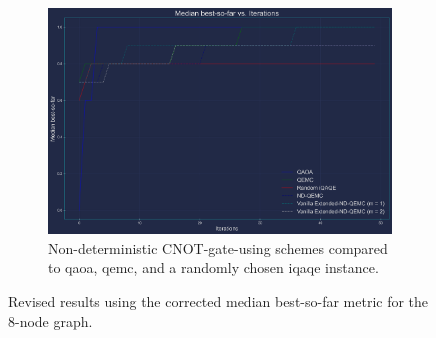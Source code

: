 \clearpage

\begin{figure}[ht!]
	\addtocounter{figure}{-1} %
    \centering
	\begin{subfigure}[t]{1\textwidth}
		\addtocounter{subfigure}{2}
		\includegraphics[width=1\textwidth]{Figures/Appendix_A/8-node/Basic+ND_QEMC_Variations(8-node).png}
		\caption{Non-deterministic CNOT-gate-using schemes compared to \acrshort{qaoa}, \acrshort{qemc}, and a randomly chosen \acrshort{iqaqe} instance.}
		\label{fig:C_BSF_5_8-node}
	\end{subfigure}
    \caption{Revised results using the corrected median best-so-far metric for the $8$-node graph.}
    \label{fig:Corrected_BSF_Results_8-node-graph}
\end{figure}
